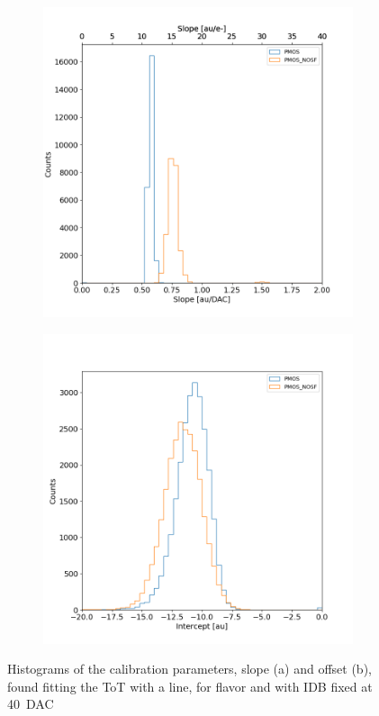         \begin{figure}[h!]
            \begin{subfigure}{.5\textwidth}
            \centering
            \includegraphics[width=.98\linewidth]{figures/charaterization/slope_histogram.png}
            \end{subfigure}
            \begin{subfigure}{.5\textwidth}
            \centering
            \includegraphics[width=.98\linewidth]{figures/charaterization/intercept_histogram.png}
            \end{subfigure}
            \caption{Histograms of the calibration parameters, slope (a) and offset (b), found fitting the ToT with a line, for  flavor and with IDB fixed at \SI{40}{DAC}}
            \label{fig:ToT_histograms_all_fl}
        \end{figure} 

